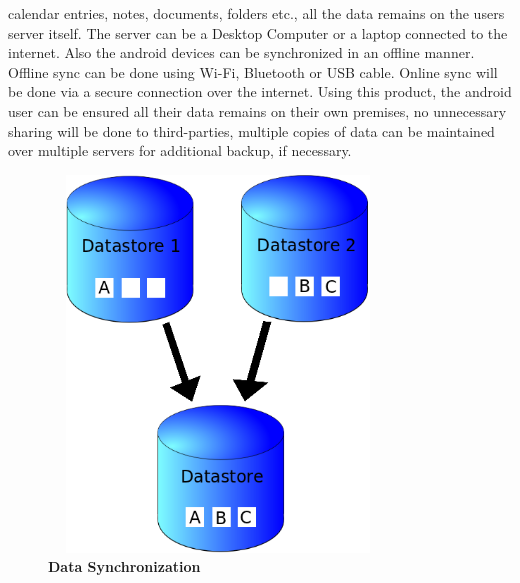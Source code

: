 calendar entries, notes, documents, folders etc., all the data remains on the users server itself.
The server can be a Desktop Computer or a laptop connected to the internet. Also the android
devices can be synchronized in an offline manner.\\[0.5cm]
\hspace*{0.82cm}Offline sync can be done using Wi-Fi, Bluetooth or USB cable. Online sync will be
done via a secure connection over the internet. Using this product, the android user can be
ensured all their data remains on their own premises, no unnecessary sharing will be done to
third-parties, multiple copies of data can be maintained over multiple servers for additional
backup, if necessary.\\[0.3cm]

\begin{figure}[H]
  \centering
    \includegraphics[height= 10cm, width=9cm]{project/images/data-sync}
  \caption{\textbf{Data Synchronization}}
\end{figure}